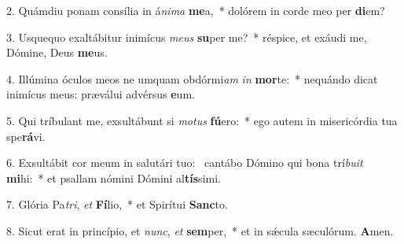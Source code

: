 2. Quámdiu ponam consília in á\textit{ni}\textit{ma} \textbf{me}a,~*  dolórem in corde meo per \textbf{di}em?\

3. Usquequo exaltábitur inimícus \textit{me}\textit{us} \textbf{su}per me?~*  réspice, et exáudi me, Dómine, Deus \textbf{me}us.\

4. Illúmina óculos meos ne umquam obdórmi\textit{am} \textit{in} \textbf{mor}te:~*  nequándo dicat inimícus meus: præválui advérsus \textbf{e}um.\

5. Qui tríbulant me, exsultábunt si \textit{mo}\textit{tus} \textbf{fú}ero:~*  ego autem in misericórdia tua spe\textbf{rá}vi.\

6. Exsultábit cor meum in salutári tuo: \dag\  cantábo Dómino qui bona trí\textit{bu}\textit{it} \textbf{mi}hi:~*  et psallam nómini Dómini al\textbf{tís}simi.\

7. Glória Pa\textit{tri}, \textit{et} \textbf{Fí}lio,~*  et Spirítui \textbf{Sanc}to.\

8. Sicut erat in princípio, et \textit{nunc}, \textit{et} \textbf{sem}per,~*  et in sǽcula sæculórum. \textbf{A}men.\

